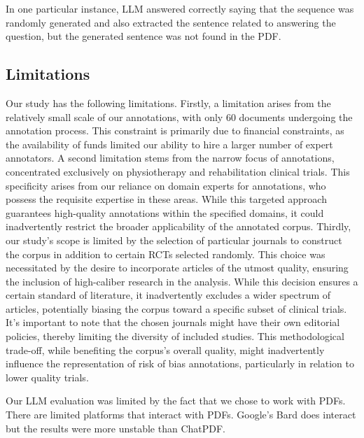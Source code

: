 \documentclass[sn-mathphys,Numbered]{sn-jnl}%
\theoremstyle{thmstyleone}%
\theoremstyle{thmstyletwo}%
\theoremstyle{thmstylethree}%
\begin{document}
In one particular instance, LLM answered correctly saying that the sequence was randomly generated and also extracted the sentence related to answering the question, but the generated sentence was not found in the PDF.

%
%
%
\subsection{Limitations}
\label{subsec:limits}
%
Our study has the following limitations.
Firstly, a limitation arises from the relatively small scale of our annotations, with only 60 documents undergoing the annotation process.
This constraint is primarily due to financial constraints, as the availability of funds limited our ability to hire a larger number of expert annotators.
A second limitation stems from the narrow focus of annotations, concentrated exclusively on physiotherapy and rehabilitation clinical trials.
This specificity arises from our reliance on domain experts for annotations, who possess the requisite expertise in these areas.
While this targeted approach guarantees high-quality annotations within the specified domains, it could inadvertently restrict the broader applicability of the annotated corpus.
Thirdly, our study's scope is limited by the selection of particular journals to construct the corpus in addition to certain RCTs selected randomly.
This choice was necessitated by the desire to incorporate articles of the utmost quality, ensuring the inclusion of high-caliber research in the analysis.
While this decision ensures a certain standard of literature, it inadvertently excludes a wider spectrum of articles, potentially biasing the corpus toward a specific subset of clinical trials.
It's important to note that the chosen journals might have their own editorial policies, thereby limiting the diversity of included studies.
This methodological trade-off, while benefiting the corpus's overall quality, might inadvertently influence the representation of risk of bias annotations, particularly in relation to lower quality trials.


Our LLM evaluation was limited by the fact that we chose to work with PDFs. 
There are limited platforms that interact with PDFs. 
Google's Bard does interact but the results were more unstable than ChatPDF.
%
%
%
\end{document}
